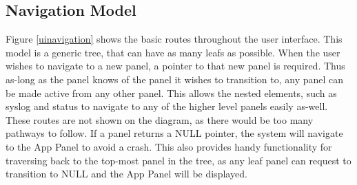 \subsection{Navigation Model}

Figure \ref{uinavigation} shows the basic routes throughout the user interface. This model is a generic tree, that can have as many leafs as possible. When the user wishes to navigate to a new panel, a pointer to that new panel is required. Thus as-long as the panel knows of the panel it wishes to transition to, any panel can be made active from any other panel. This allows the nested elements, such as syslog and status to navigate to any of the higher level panels easily as-well. These routes are not shown on the diagram, as there would be too many pathways to follow. If a panel returns a NULL pointer, the system will navigate to the App Panel to avoid a crash. This also provides handy functionality for traversing back to the top-most panel in the tree, as any leaf panel can request to transition to NULL and the App Panel will be displayed.






















